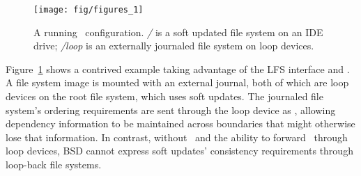 \begin{figure}[tb]
  \centering
  \texttt{[image: fig/figures\_1]}
  \caption{A running \Kudos\ configuration. {\it/} is a soft updated
    file system on an IDE drive; {\it/loop} is an externally journaled
    file system on loop devices.}
  \label{fig:kfs-graph}
\end{figure}

Figure~\ref{fig:kfs-graph} shows a contrived example taking advantage of the LFS
interface and \chdescs. A file system image is mounted with an external journal,
both of which are loop devices on the root file system, which uses soft updates.
The journaled file system's ordering requirements are sent through the loop
device as \chdescs, allowing dependency information to be maintained across
boundaries that might otherwise lose that information. In contrast, without
\chdescs\ and the ability to forward \chdescs\ through loop devices, BSD cannot
express soft updates' consistency requirements through loop-back file systems.
